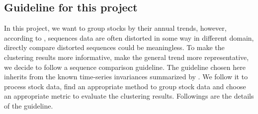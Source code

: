 \subsection{Guideline for this project}
\label{sec:invariance}
In this project, we want to group stocks by their annual trends, however, according to \cite{batista2014cid}, sequences data are often distorted in some way in different domain, directly compare distorted sequences could be meaningless. To make the clustering results more informative, make the general trend more representative, we decide to follow a sequence comparison guideline. The guideline chosen here inherits from the known time-series invariances summarized by \cite{paparrizos2015k}. We follow it to process stock data, find an appropriate method to group stock data and choose an appropriate metric to evaluate the clustering results. Followings are the details of the guideline.
